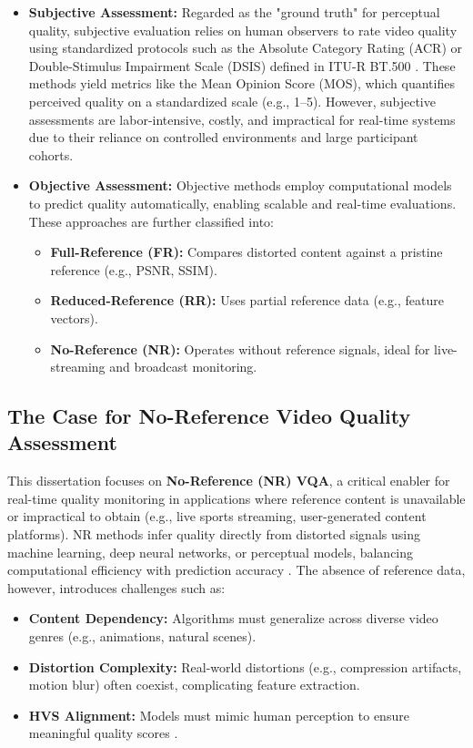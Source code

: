 \begin{itemize}  
    \item \textbf{Subjective Assessment:} Regarded as the "ground truth" for perceptual quality, subjective evaluation relies on human observers to rate video quality using standardized protocols such as the Absolute Category Rating (ACR) or Double-Stimulus Impairment Scale (DSIS) defined in ITU-R BT.500 \cite{itu2012recommendation}. These methods yield metrics like the Mean Opinion Score (MOS), which quantifies perceived quality on a standardized scale (e.g., 1–5). However, subjective assessments are labor-intensive, costly, and impractical for real-time systems due to their reliance on controlled environments and large participant cohorts.  

    \item \textbf{Objective Assessment:} Objective methods employ computational models to predict quality automatically, enabling scalable and real-time evaluations. These approaches are further classified into:  
    \begin{itemize}  
        \item \textbf{Full-Reference (FR):} Compares distorted content against a pristine reference (e.g., PSNR, SSIM).  
        \item \textbf{Reduced-Reference (RR):} Uses partial reference data (e.g., feature vectors).  
        \item \textbf{No-Reference (NR):} Operates without reference signals, ideal for live-streaming and broadcast monitoring.  
    \end{itemize}  
\end{itemize}  

\subsection{The Case for No-Reference Video Quality Assessment}  
This dissertation focuses on \textbf{No-Reference (NR) VQA}, a critical enabler for real-time quality monitoring in applications where reference content is unavailable or impractical to obtain (e.g., live sports streaming, user-generated content platforms). NR methods infer quality directly from distorted signals using machine learning, deep neural networks, or perceptual models, balancing computational efficiency with prediction accuracy \cite{min2024perceptual}. The absence of reference data, however, introduces challenges such as:  
\begin{itemize}  
    \item \textbf{Content Dependency:} Algorithms must generalize across diverse video genres (e.g., animations, natural scenes).  
    \item \textbf{Distortion Complexity:} Real-world distortions (e.g., compression artifacts, motion blur) often coexist, complicating feature extraction.  
    \item \textbf{HVS Alignment:} Models must mimic human perception to ensure meaningful quality scores \cite{wang2004ssim}.  
\end{itemize}  

